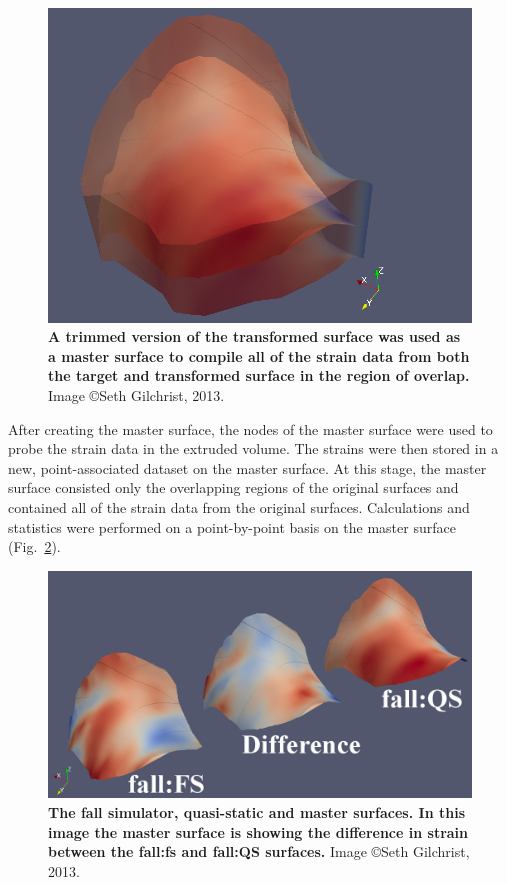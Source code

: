 \begin{figure}
\centering
\includegraphics[width=0.7\linewidth]{./fracture/Figures/Transfer}
\caption[Transfer of \acs*{dic} data between surfaces]{\textbf{A trimmed version of the transformed surface was used as a master surface to compile all of the strain data from both the target and transformed surface in the region of overlap.} Image \copyright Seth Gilchrist, 2013.}
\label{fig:TransferData}
\end{figure}

After creating the master surface, the nodes of the master surface were used to probe the strain data in the extruded volume.
The strains were then stored in a new, point-associated dataset on the master surface.
At this stage, the master surface consisted only the overlapping regions of the original surfaces and contained all of the strain data from the original surfaces.
Calculations and statistics were performed on a point-by-point basis on the master surface (Fig.~\ref{fig:DuplicateSurfaceswithdata}).

\begin{figure}
\centering
\includegraphics[width=0.7\linewidth]{./fracture/Figures/DuplicateSurfaceswithdata}
\caption[Surfaces to compare \acs*{dic} results]{\textbf{The fall simulator, quasi-static and master surfaces. In this image the master surface is showing the difference in strain between the fall:\ac{fs} and fall:\ac{QS} surfaces.} Image \copyright Seth Gilchrist, 2013.}
\label{fig:DuplicateSurfaceswithdata}
\end{figure}

